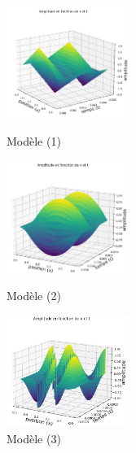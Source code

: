 \subtitle\underline{Euler explicite}



\begin{figure}[H]
  \includegraphics[width=4cm]{1.png}
  \caption{Modèle (1)}\label{fig}
\endminipage\hfill
{}
  \includegraphics[width=4cm]{2.png}
  \caption{Modèle (2)}\label{fig}
\endminipage\hfill
{}%
  \includegraphics[width=4cm]{7_explicite.png}
  \caption{Modèle (3)}\label{fig}
\endminipage
\end{figure}



\subtitle\underline{Euler implicite}

